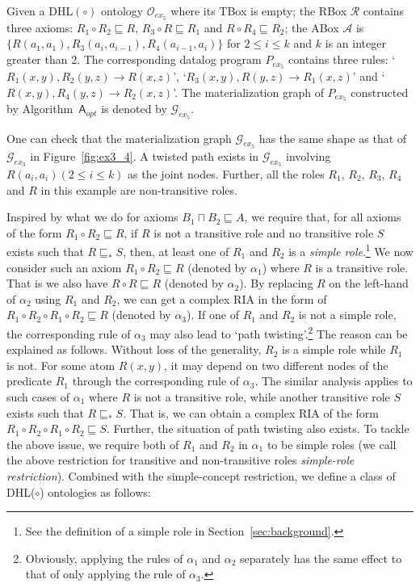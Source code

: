 \documentclass[final,1p,times]{elsarticle}
\begin{document}
\begin{example}\label{exp:complexRIA}
Given a DHL$(\circ)$ ontology $\mathcal{O}_{ex_5}$ where its TBox is empty;
the RBox $\mathcal{R}$ contains three axioms:
$R_1\circ R_2\sqsubseteq R$, $R_3\circ R\sqsubseteq R_1$ and $R\circ R_4\sqsubseteq R_2$;
the ABox $\mathcal{A}$ is $\{R(a_1,a_1), R_3(a_i,a_{i-1}), R_4(a_{i-1},a_i)\}$
for $2\leq i\leq k$ and $k$ is an integer greater than 2.
The corresponding datalog program $P_{ex_5}$
contains three rules: `$R_1(x,y),R_2(y,z)\rightarrow R(x,z)$',
`$R_3(x,y),R(y,z)\rightarrow R_1(x,z)$' and `$R(x,y),R_4(y,z)\rightarrow R_2(x,z)$'.
The materialization graph of $P_{ex_5}$ constructed by Algorithm~$\mathsf{A}_{opt}$ is denoted by $\mathcal{G}_{ex_5}$.
\end{example}

One can check that the materialization graph $\mathcal{G}_{ex_5}$ has the same shape as that
of $\mathcal{G}_{ex_3}$ in Figure~\ref{fig:ex3_4}.
A twisted path exists in $\mathcal{G}_{ex_5}$ involving $R(a_i,a_i) (2\leq i\leq k)$ as the joint nodes.
Further, all the roles $R_1$, $R_2$, $R_3$, $R_4$ and $R$ in this example are non-transitive roles.

Inspired by what we do for axioms $B_1\sqcap B_2\sqsubseteq A$,
we require that, for all axioms of the form $R_1\circ R_2\sqsubseteq R$,
if $R$ is not a transitive role and no transitive role $S$ exists such that $R\sqsubseteq_* S$,
then, at least one of $R_1$ and $R_2$ is
a \emph{simple role}.\footnote{See the definition of a simple role in Section~\ref{sec:background}.}
We now consider such an axiom $R_1\circ R_2\sqsubseteq R$ (denoted by $\alpha_1$) where $R$ is a transitive role.
That is we also have $R\circ R\sqsubseteq R$ (denoted by $\alpha_2$).
By replacing $R$ on the left-hand of $\alpha_2$ using $R_1$ and $R_2$,
we can get a complex RIA in the form of
$R_1\circ R_2\circ R_1\circ R_2\sqsubseteq R$ (denoted by $\alpha_3$).
If one of $R_1$ and $R_2$ is not a simple role, the corresponding
rule of $\alpha_3$ may also lead to `path twisting'.\footnote{Obviously, applying the rules of $\alpha_1$
and $\alpha_2$ separately has the same effect to that of only applying the rule of $\alpha_3$.}
The reason can be explained as follows.
Without loss of the generality,
$R_2$ is a simple role while $R_1$ is not.
For some atom $R(x,y)$, it may depend on two different nodes of the predicate $R_1$
through the corresponding rule of $\alpha_3$. The similar analysis applies to
such cases of $\alpha_1$ where $R$ is not a transitive role, while another transitive
role $S$ exists such that $R\sqsubseteq_* S$. That is, we can obtain
a complex RIA of the form $R_1\circ R_2\circ R_1\circ R_2\sqsubseteq S$.
Further, the situation of path twisting also exists.
To tackle the above issue,
we require both of $R_1$ and $R_2$ in $\alpha_1$ to be simple roles
(we call the above restriction for transitive and non-transitive roles \emph{simple-role restriction}).
Combined with the simple-concept restriction,
we define a class of DHL($\circ$) ontologies as follows:
\end{document}
